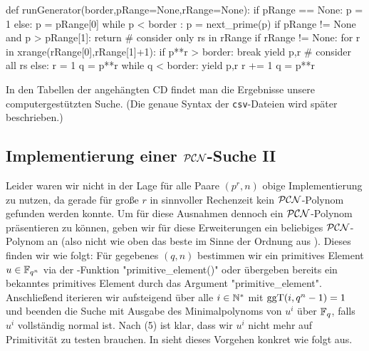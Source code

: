 \begin{sagecode}[caption={[\texttt{runGenerator} aus 
 \url{../Sage/findAnyPCN_trinom.spyx}]Aus \url{../Sage/findAnyPCN_trinom.spyx}}]
def runGenerator(border,pRange=None,rRange=None):
    if pRange == None:
        p = 1
    else:
        p = pRange[0]
    while p < border :
        p = next_prime(p)
        if pRange != None and p > pRange[1]: return
        # consider only rs in rRange
        if rRange != None:
            for r in xrange(rRange[0],rRange[1]+1):
                if p**r > border: break
                yield p,r
        # consider all rs
        else:
            r = 1
            q = p**r
            while q < border:
                yield p,r
                r += 1
                q = p**r
\end{sagecode}

In den Tabellen der angehängten CD findet man die Ergebnisse unsere
computergestützten Suche. (Die genaue Syntax der \texttt{csv}-Dateien wird
später beschrieben.)


\subsection{Implementierung einer $\mathcal{PCN}$-Suche II}
\label{subsec:impl_pcn_ii}

Leider waren wir nicht in der Lage für alle Paare $(p^r,n)$ obige Implementierung
zu nutzen, da gerade für große $r$ in sinnvoller Rechenzeit kein $\mathcal{PCN}$-Polynom
gefunden werden konnte. Um für diese Ausnahmen dennoch ein $\mathcal{PCN}$-Polynom
präsentieren zu können, geben wir für diese Erweiterungen ein beliebiges
$\mathcal{PCN}$-Polynom an (also nicht wie oben das beste im Sinne der Ordnung aus
). Dieses finden wir wie folgt: Für gegebenes $(q,n)$
bestimmen wir ein primitives Element $u \in \mathbb{F}_{q^n}$ via der \sage-Funktion
"primitive_element()" oder übergeben bereits ein bekanntes
primitives Element durch das Argument "primitive_element".
Anschließend iterieren wir aufsteigend über alle 
$i\in\mathbb{N}^\ast$ mit $\operatorname{ggT}(i,q^n-1) = 1$ und beenden die Suche mit
Ausgabe des Minimalpolynoms von $u^i$ über $\mathbb{F}_q$, falls
$u^i$ vollständig normal ist. Nach  (5) ist klar, dass
wir $u^i$ nicht mehr auf Primitivität zu testen brauchen.
In \sage sieht dieses Vorgehen konkret wie folgt aus.

